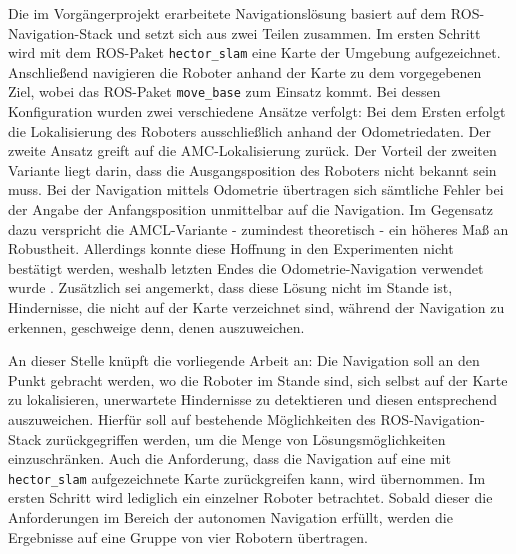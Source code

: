 Die im Vorgängerprojekt \cite{Turtleboys} erarbeitete Navigationslösung basiert auf dem ROS-Navigation-Stack und setzt sich aus zwei Teilen zusammen. Im ersten Schritt wird mit dem ROS-Paket \lstinline{hector_slam}{} \cite{WikiHector} eine Karte der Umgebung aufgezeichnet. Anschließend navigieren die Roboter anhand der Karte zu dem vorgegebenen Ziel, wobei das ROS-Paket \lstinline{move_base}{} \cite{WikiMoveBase} zum Einsatz kommt. Bei dessen Konfiguration wurden zwei verschiedene Ansätze verfolgt: Bei dem Ersten erfolgt die Lokalisierung des Roboters ausschließlich anhand der Odometriedaten. Der zweite Ansatz greift auf die AMC-Lokalisierung zurück. Der Vorteil der zweiten Variante liegt darin, dass die Ausgangsposition des Roboters nicht bekannt sein muss. Bei der Navigation mittels Odometrie übertragen sich sämtliche Fehler bei der Angabe der Anfangsposition unmittelbar auf die Navigation. Im Gegensatz dazu verspricht die AMCL-Variante - zumindest theoretisch - ein höheres Maß an Robustheit. Allerdings konnte diese Hoffnung in den Experimenten nicht bestätigt werden, weshalb letzten Endes die Odometrie-Navigation verwendet wurde \cite[S. 43]{Turtleboys}. Zusätzlich sei angemerkt, dass diese Lösung nicht im Stande ist, Hindernisse, die nicht auf der Karte verzeichnet sind, während der Navigation zu erkennen, geschweige denn, denen auszuweichen.

An dieser Stelle knüpft die vorliegende Arbeit an: Die Navigation soll an den Punkt gebracht werden, wo die Roboter im Stande sind, sich selbst auf der Karte zu lokalisieren, unerwartete Hindernisse zu detektieren und diesen entsprechend auszuweichen. Hierfür soll auf bestehende Möglichkeiten des ROS-Navigation-Stack zurückgegriffen werden, um die Menge von Lösungsmöglichkeiten einzuschränken. Auch die Anforderung, dass die Navigation auf eine mit \lstinline{hector_slam}{} aufgezeichnete Karte zurückgreifen kann, wird übernommen. Im ersten Schritt wird lediglich ein einzelner Roboter betrachtet. Sobald dieser die Anforderungen im Bereich der autonomen Navigation erfüllt, werden die Ergebnisse auf eine Gruppe von vier Robotern übertragen.

